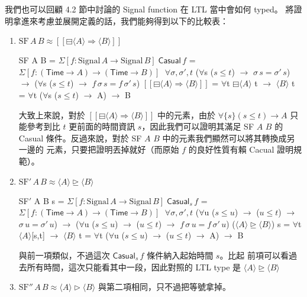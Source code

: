 \documentclass{article}
\newcommand{\llens}{[\![}
\newcommand{\rlens}{]\!]}
\newcommand{\Time}{\mathsf{Time}}
\newcommand{\Gs}{\sigma}
\newcommand{\E}[1]{\Sigma[#1]\;}
\begin{document}
  我們也可以回顧 4.2 節中討論的 Signal function 在 LTL 當中會如何 typed。
  將證明拿進來考慮並展開定義的話，我們能夠得到以下的比較表：

  \begin{enumerate}
    \item $\text{SF}\,A\,B \approx \llens \boxminus \langle A\rangle \Rightarrow \langle B\rangle\rlens$
    \begin{code}
SF A B = $\E{f : \text{Signal}\, A \to \text{Signal}\, B} \mathsf{Casual}\,f$
           = $\E{f : (\Time\to A)\to(\Time\to B)}$
               $\forall${$\Gs,\Gs',t$} ($\forall${s} ($s\le t$) $\to$ $\Gs\,s=\Gs'\,s$) $\to$ ($\forall${s} ($s\le t$) $\to$ $f\,\Gs\,s=f\,\Gs'\,s$)
$\llens\boxminus\langle A\rangle \Rightarrow \langle B\rangle\rlens$ = $\forall${t} $\boxminus\langle A\rangle$ t $\to$ $\langle B\rangle$ t
                    = $\forall${t} ($\forall${s} ($s\le t$) $\to$ A) $\to$ B
    \end{code}

    大致上來說，對於 $\llens \boxminus\langle A\rangle \Rightarrow \langle B\rangle \rlens$ 中的元素，由於 $\forall\{s\}(s\le t)\to A$ 只能參考到比 $t$ 更前面的時間資訊 $s$，因此我們可以證明其滿足 SF $A$ $B$ 的 Casual
    條件。反過來說，對於 SF $A$ $B$ 中的元素我們顯然可以將其轉換成另一邊的
    元素，只要把證明丟掉就好（而原始 $f$ 的良好性質有賴 Cacual 證明規範）。

    \item $\text{SF}'\,A\,B\approx \langle A\rangle \unrhd \langle B\rangle$
    \begin{code}
SF$'$ A B s = $\E{f : \text{Signal}\, A \to \text{Signal}\, B} \mathsf{Casual}_s\,f$
              = $\E{f : (\Time\to A)\to(\Time\to B)}$
                  $\forall${$\Gs,\Gs',t$} ($\forall${u} ($s\le u$) $\to$ ($u\le t$) $\to$ $\Gs\,u=\Gs'\,u$) $\to$
                                ($\forall${u} ($s\le u$) $\to$ ($u\le t$) $\to$ $f\,\Gs\,u=f\,\Gs'\,u$)
($\langle A\rangle \unrhd \langle B\rangle$) s = $\forall${t} $\langle A\rangle$[s,t] $\to$ $\langle B\rangle$ t
                   = $\forall${t} ($\forall${u} ($s\le u$) $\to$ ($u\le t$) $\to$ A) $\to$ B
    \end{code}

    與前一項類似，不過這次 $\mathsf{Casual}_s\,f$ 條件納入起始時間 $s$。比起
    前項可以看過去所有時間，這次只能看其中一段，因此對照的 LTL type 是
    $\langle A\rangle\unrhd\langle B\rangle$

    \item $\text{SF}''\,A\,B\approx\langle A\rangle \rhd\langle B\rangle$
    與第二項相同，只不過把等號拿掉。

  \end{enumerate}
\end{document}
